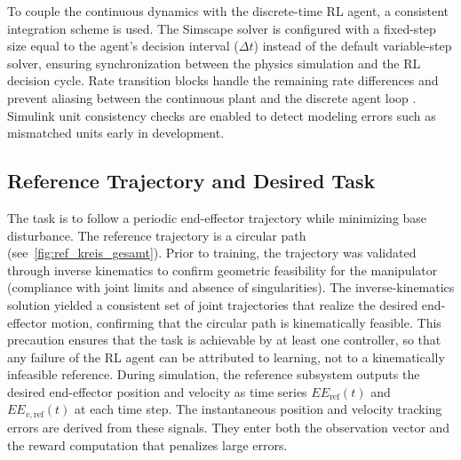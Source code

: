 \documentclass{ieeeaccess}
\begin{document}
To couple the continuous dynamics with the discrete-time RL agent, a
consistent integration scheme is used. The Simscape solver is configured with a fixed-step size
equal to the agent's decision interval ($\Delta t$) instead of the default variable-step solver,
ensuring
synchronization between the physics simulation and the RL decision cycle. Rate
transition blocks handle the remaining rate differences and prevent aliasing between the continuous plant
and the discrete agent loop \cite{b29,b30}.
Simulink unit consistency checks are enabled to detect modeling errors such as
mismatched units early in development.

\subsection{Reference Trajectory and Desired Task} The task is to follow a periodic end-effector
trajectory while minimizing base disturbance. The reference trajectory is a circular
path (see~\autoref{fig:ref_kreis_gesamt}). Prior to training, the trajectory was validated through inverse kinematics to confirm
geometric feasibility for the manipulator (compliance with joint limits and absence of singularities). The
inverse-kinematics solution yielded a consistent set of joint trajectories that realize the desired end-effector
motion, confirming that the circular path is kinematically feasible.
This precaution ensures that the task is achievable by at least one controller, so
that any failure of the RL agent can be attributed to learning, not to
a kinematically infeasible reference. During simulation, the reference subsystem outputs the desired end-effector position
and velocity
as time series $EE_{\mathrm{ref}}(t)$ and $EE_{v,\mathrm{ref}}(t)$ at each time step. The instantaneous position and
velocity tracking errors are derived from these signals. They enter both the observation vector
and the reward computation that penalizes large errors.

\end{document}
